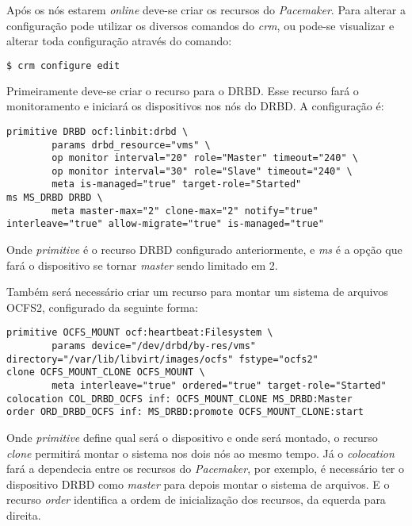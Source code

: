 Após os nós estarem \textit{online} deve-se criar os recursos do \textit{Pacemaker}. Para alterar a configuração pode utilizar os diversos
comandos do \textit{crm}, ou pode-se visualizar e alterar toda configuração através do comando:
\begin{lstlisting}[language=bash]
 $ crm configure edit
\end{lstlisting}

Primeiramente deve-se criar o recurso para o \ac{DRBD}. Esse recurso fará o monitoramento e iniciará os dispositivos nos nós do \ac{DRBD}.
A configuração é:
\begin{lstlisting}
primitive DRBD ocf:linbit:drbd \
        params drbd_resource="vms" \
        op monitor interval="20" role="Master" timeout="240" \
        op monitor interval="30" role="Slave" timeout="240" \
        meta is-managed="true" target-role="Started"
ms MS_DRBD DRBD \
        meta master-max="2" clone-max="2" notify="true" interleave="true" allow-migrate="true" is-managed="true" 
\end{lstlisting}
Onde \textit{primitive} é o recurso \ac{DRBD} configurado anteriormente, e \textit{ms} é a opção que fará o dispositivo se tornar \textit{master}
sendo limitado em 2.

Também será necessário criar um recurso para montar um sistema de arquivos \ac{OCFS2}, configurado da seguinte forma:
\begin{lstlisting}
primitive OCFS_MOUNT ocf:heartbeat:Filesystem \
        params device="/dev/drbd/by-res/vms" directory="/var/lib/libvirt/images/ocfs" fstype="ocfs2"
clone OCFS_MOUNT_CLONE OCFS_MOUNT \
        meta interleave="true" ordered="true" target-role="Started"
colocation COL_DRBD_OCFS inf: OCFS_MOUNT_CLONE MS_DRBD:Master
order ORD_DRBD_OCFS inf: MS_DRBD:promote OCFS_MOUNT_CLONE:start
\end{lstlisting}
Onde \textit{primitive} define qual será o dispositivo e onde será montado, o recurso \textit{clone} permitirá montar o sistema nos dois nós
ao mesmo tempo. Já o \textit{colocation} fará a dependecia entre os recursos do \textit{Pacemaker}, por exemplo, é necessário ter o dispositivo 
\ac{DRBD} como \textit{master} para depois montar o sistema de arquivos. E o recurso \textit{order} identifica a ordem de inicialização dos 
recursos, da equerda para direita.


